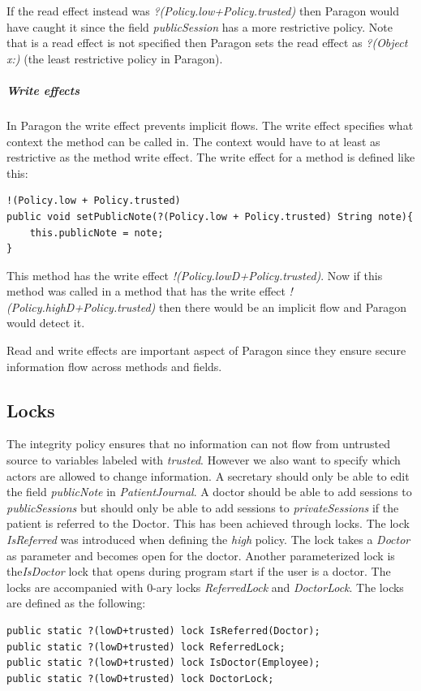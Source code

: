 If the read effect instead was \emph{?(Policy.low+Policy.trusted)} then Paragon would have caught it since the field \emph{publicSession} has a more restrictive policy. Note that is a read effect is not specified then Paragon sets the read effect as \emph{?(Object x:)} (the least restrictive policy in Paragon).

\subparagraph{Write effects}
In Paragon the write effect prevents implicit flows. The write effect specifies what context the method can be called in. The context would have to at least as restrictive as the method write effect. The write effect for a method is defined like this:

\begin{lstlisting}
!(Policy.low + Policy.trusted) 
public void setPublicNote(?(Policy.low + Policy.trusted) String note){
	this.publicNote = note;
}
\end{lstlisting}

This method has the write effect \emph{!(Policy.lowD+Policy.trusted)}. Now if this method was called in a method that has the write effect \emph{!(Policy.highD+Policy.trusted)} then there would be an implicit flow and Paragon would detect it.

Read and write effects are important aspect of Paragon since they ensure secure information flow across methods and fields.

\subsection{Locks}
The integrity policy ensures that no information can not flow from untrusted source to variables labeled with \emph{trusted}. However we also want to specify which actors are allowed to change information. A secretary should only be able to edit the field \emph{publicNote} in \emph{PatientJournal}. A doctor should be able to add sessions to \emph{publicSessions} but should only be able to add sessions to \emph{privateSessions} if the patient is referred to the Doctor. This has been achieved through locks. The lock \emph{IsReferred} was introduced when defining the \emph{high} policy. The lock takes a \emph{Doctor} as parameter and becomes open for the doctor. Another parameterized lock is the\emph{IsDoctor} lock that opens during program start if the user is a doctor. The locks are accompanied with 0-ary locks \emph{ReferredLock} and \emph{DoctorLock}. The locks are defined as the following: 

\begin{lstlisting}
public static ?(lowD+trusted) lock IsReferred(Doctor); 
public static ?(lowD+trusted) lock ReferredLock;
public static ?(lowD+trusted) lock IsDoctor(Employee);
public static ?(lowD+trusted) lock DoctorLock;
\end{lstlisting}

